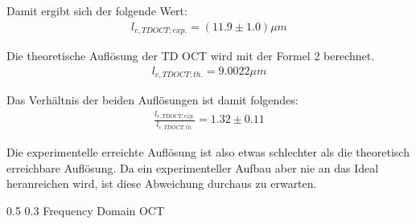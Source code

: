 \documentclass[german, %
parskip=full, %
bibliography=totoc, %
]{scrartcl}
\makeatletter
\renewcommand\subsection{\@startsection 
   {subsection}{2}{0mm}%
   {0.5\baselineskip}%
   {0.3\baselineskip}%
   {\bfseries\sffamily\large}%
   }
\makeatother
\begin{document}
Damit ergibt sich der folgende Wert:
\begin{align*}
l_{c, TD OCT; exp.} = (11.9 \pm 1.0) \mu m
\end{align*}

Die theoretische Auflösung der TD OCT wird mit der Formel 2 berechnet. 
\begin{align*}
l_{c, TD OCT; th.} = 9.0022 \mu m
\end{align*}

Das Verhältnis der beiden Auflösungen ist damit folgendes:
\begin{align*}
\frac{l_{c, TD OCT; exp.}}{l_{c, TD OCT; th.}} = 1.32 \pm 0.11
\end{align*}

Die experimentelle erreichte Auflösung ist also etwas schlechter als die theoretisch erreichbare Auflösung. Da ein experimenteller Aufbau aber nie an das Ideal heranreichen wird, ist diese Abweichung durchaus zu erwarten.

\subsection{Frequency Domain OCT}
\end{document}
